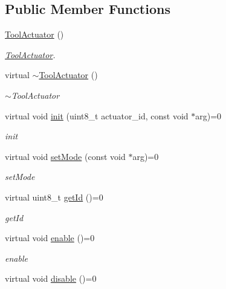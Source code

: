 \subsection*{Public Member Functions}
\begin{DoxyCompactItemize}
\item 
\hyperlink{classrobotis__manipulator_1_1_tool_actuator_a393a1f2eb9247c20b56f679da40cc390}{Tool\+Actuator} ()
\begin{DoxyCompactList}\small\item\em \hyperlink{classrobotis__manipulator_1_1_tool_actuator}{Tool\+Actuator}. \end{DoxyCompactList}\item 
virtual \hyperlink{classrobotis__manipulator_1_1_tool_actuator_a0c1149bde6ce9ff31b7291a8d97c46cd}{$\sim$\+Tool\+Actuator} ()
\begin{DoxyCompactList}\small\item\em $\sim$\+Tool\+Actuator \end{DoxyCompactList}\item 
virtual void \hyperlink{classrobotis__manipulator_1_1_tool_actuator_a81d51f1ce5e2c7afc3244ce106d2acd9}{init} (uint8\+\_\+t actuator\+\_\+id, const void $\ast$arg)=0
\begin{DoxyCompactList}\small\item\em init \end{DoxyCompactList}\item 
virtual void \hyperlink{classrobotis__manipulator_1_1_tool_actuator_a03b26fd9cfc195aaca7bc2e506847e5e}{set\+Mode} (const void $\ast$arg)=0
\begin{DoxyCompactList}\small\item\em set\+Mode \end{DoxyCompactList}\item 
virtual uint8\+\_\+t \hyperlink{classrobotis__manipulator_1_1_tool_actuator_afd249246d350782587c2e115b0a46e6f}{get\+Id} ()=0
\begin{DoxyCompactList}\small\item\em get\+Id \end{DoxyCompactList}\item 
virtual void \hyperlink{classrobotis__manipulator_1_1_tool_actuator_a8515f35a6b77350af9476e6d0a7c41f3}{enable} ()=0
\begin{DoxyCompactList}\small\item\em enable \end{DoxyCompactList}\item 
virtual void \hyperlink{classrobotis__manipulator_1_1_tool_actuator_afa622c462cd4221645f7004b486359db}{disable} ()=0

\end{DoxyCompactItemize}

